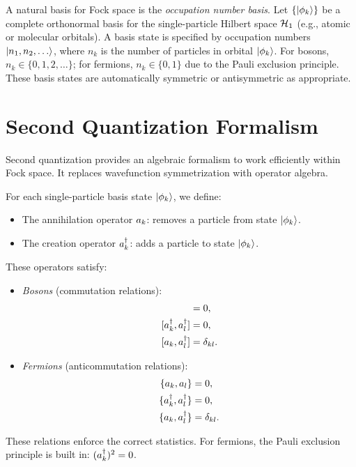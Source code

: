 A natural basis for Fock space is the \emph{occupation number basis}. Let \(\{\ket{\phi_k}\}\) be a complete orthonormal basis for the single-particle Hilbert space \(\mathcal{H}_1\) (e.g., atomic or molecular orbitals). A basis state is specified by occupation numbers \(\ket{n_1, n_2, \dots}\), where \(n_k\) is the number of particles in orbital \(\ket{\phi_k}\). For bosons, \(n_k \in \{0,1,2,\dots\}\); for fermions, \(n_k \in \{0,1\}\) due to the Pauli exclusion principle. These basis states are automatically symmetric or antisymmetric as appropriate.

\section{Second Quantization Formalism}
\label{sec:foundations_second_quant}

Second quantization provides an algebraic formalism to work efficiently within Fock space. It replaces wavefunction symmetrization with operator algebra.

For each single-particle basis state \(\ket{\phi_k}\), we define:
\begin{itemize}
	\item The annihilation operator \(a_{k}\): removes a particle from state \(\ket{\phi_k}\).
	\item The creation operator \(a^\dagger_{k}\): adds a particle to state \(\ket{\phi_k}\).
\end{itemize}
These operators satisfy:
\begin{itemize}
	\item \emph{Bosons} (commutation relations):
	\begin{align}
		[\aop{k}, \aop{l}] &= 0, \\
		[\adag{k}, \adag{l}] &= 0, \\
		[\aop{k}, \adag{l}] &= \delta_{kl}.
	\end{align}
	\item \emph{Fermions} (anticommutation relations):
	\begin{align}
		\{a_{k}, a_{l}\} &= 0, \\
		\{a^\dagger_{k}, a^\dagger_{l}\} &= 0, \\
		\{a_{k}, a^\dagger_{l}\} &= \delta_{kl}.
	\end{align}
\end{itemize}
These relations enforce the correct statistics. For fermions, the Pauli exclusion principle is built in: \((a^\dagger_{k})^2 = 0\).

